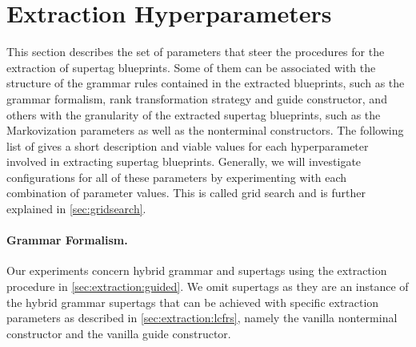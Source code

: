 \documentclass[../../document.tex]{subfiles}
\begin{document}
    \section{Extraction Hyperparameters}\label{sec:hyperparameters}
    This section describes the set of parameters that steer the procedures for the extraction of supertag blueprints.
    Some of them can be associated with the structure of the grammar rules contained in the extracted blueprints, such as the grammar formalism, rank transformation strategy and guide constructor, and others with the granularity of the extracted supertag blueprints, such as the Markovization parameters as well as the nonterminal constructors.
    The following list of gives a short description and viable values for each hyperparameter involved in extracting supertag blueprints.
    Generally, we will investigate configurations for all of these parameters by experimenting with each combination of parameter values.
    This is called grid search and is further explained in \cref{sec:gridsearch}.

    \paragraph*{Grammar Formalism.}
    Our experiments concern hybrid grammar and  supertags using the extraction procedure in \cref{sec:extraction:guided}.
    We omit  supertags as they are an instance of the hybrid grammar supertags that can be achieved with specific extraction parameters as described in \cref{sec:extraction:lcfrs}, namely the vanilla nonterminal constructor and the vanilla guide constructor.
\end{document}
